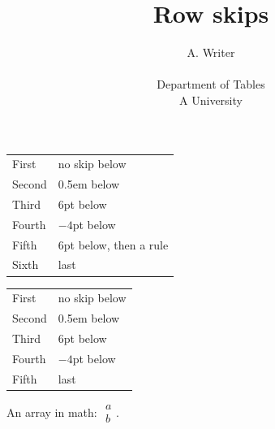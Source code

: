 \documentclass{article}
\title{Row skips}
\author{A. Writer \\[0.5em]
    \begin{tabular}{c}Department of Tables\\[3pt]A University\end{tabular}}
\date{}
\begin{document}
\maketitle

\noindent\begin{tabular}{|l|l|}
    \hline
    First & no skip below \\
    Second & 0.5em below \\[0.5em]
    Third & 6pt below \\[6pt]
    Fourth & $-4$pt below \\[-4pt]
    Fifth & 6pt below, then a rule \\[6pt]
    \hline
    Sixth & last \\
    \hline
\end{tabular}

\begin{longtable}{|l|l|}
    \hline
    First & no skip below \\
    Second & 0.5em below \\[0.5em]
    Third & 6pt below \\[6pt]
    Fourth & $-4$pt below \\[-4pt]
    Fifth & last \\
    \hline
\end{longtable}

An array in math: $\begin{array}{c} a \\[6pt] b \end{array}$.
\end{document}
